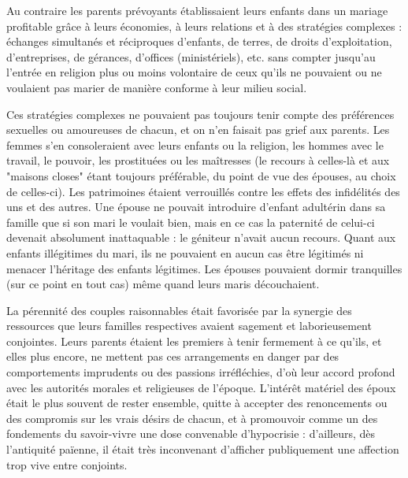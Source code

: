  Au contraire les parents prévoyants établissaient leurs enfants dans un mariage profitable grâce à leurs économies, à leurs relations et à des stratégies complexes : échanges simultanés et réciproques d'enfants, de terres, de droits d'exploitation, d'entreprises, de gérances, d'offices (ministériels), etc. sans compter jusqu'au  l'entrée en religion plus ou moins volontaire de ceux qu'ils ne pouvaient ou ne voulaient pas marier de manière conforme à leur milieu social. 

 Ces stratégies complexes ne pouvaient pas toujours tenir compte des préférences sexuelles ou amoureuses de chacun, et on n'en faisait pas grief aux parents. Les femmes s'en consoleraient avec leurs enfants ou la religion, les hommes avec le travail, le pouvoir, les prostituées ou les maîtresses (le recours à celles-là et aux "maisons closes" étant toujours préférable, du point de vue des épouses, au choix de celles-ci). Les patrimoines étaient verrouillés contre les effets des infidélités des uns et des autres. Une épouse ne pouvait introduire d'enfant adultérin dans sa famille que si son mari le voulait bien, mais en ce cas la paternité de celui-ci devenait absolument inattaquable : le géniteur n'avait aucun recours. Quant aux enfants illégitimes du mari, ils ne pouvaient en aucun cas être légitimés ni menacer l'héritage des enfants légitimes. Les épouses pouvaient dormir tranquilles (sur ce point en tout cas) même quand leurs maris découchaient. 

 La pérennité des couples raisonnables était favorisée par la synergie des ressources que leurs familles respectives avaient sagement et laborieusement conjointes. Leurs parents étaient les premiers à tenir fermement à ce qu'ils, et elles plus encore, ne mettent pas ces arrangements en danger par des comportements imprudents ou des passions irréfléchies, d'où leur accord profond avec les autorités morales et religieuses de l'époque. L'intérêt matériel des époux était le plus souvent de rester ensemble, quitte à accepter des renoncements ou des compromis sur les vrais désirs de chacun, et à promouvoir comme un des fondements du savoir-vivre une dose convenable d'hypocrisie : d'ailleurs, dès l'antiquité païenne, il était très inconvenant d'afficher publiquement une affection trop vive entre conjoints. 


